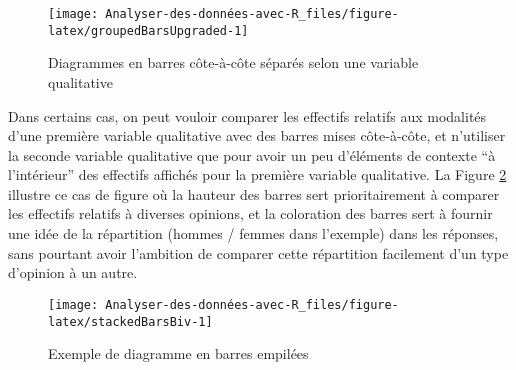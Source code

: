 \documentclass[
  french,
]{book}
\newenvironment{Shaded}{\begin{snugshade}}{\end{snugshade}}
\newcommand{\DataTypeTok}[1]{\textcolor[rgb]{0.13,0.29,0.53}{#1}}
\newcommand{\DecValTok}[1]{\textcolor[rgb]{0.00,0.00,0.81}{#1}}
\newcommand{\FloatTok}[1]{\textcolor[rgb]{0.00,0.00,0.81}{#1}}
\newcommand{\KeywordTok}[1]{\textcolor[rgb]{0.13,0.29,0.53}{\textbf{#1}}}
\newcommand{\NormalTok}[1]{#1}
\newcommand{\OperatorTok}[1]{\textcolor[rgb]{0.81,0.36,0.00}{\textbf{#1}}}
\newcommand{\StringTok}[1]{\textcolor[rgb]{0.31,0.60,0.02}{#1}}
\begin{document}
\begin{figure}

{\centering \texttt{[image: Analyser-des-données-avec-R\_files/figure-latex/groupedBarsUpgraded-1]} 

}

\caption{Diagrammes en barres côte-à-côte séparés selon une variable qualitative}\label{fig:groupedBarsUpgraded}
\end{figure}

Dans certains cas, on peut vouloir comparer les effectifs relatifs aux modalités d'une première variable qualitative avec des barres mises côte-à-côte, et n'utiliser la seconde variable qualitative que pour avoir un peu d'éléments de contexte ``à l'intérieur'' des effectifs affichés pour la première variable qualitative. La Figure \ref{fig:stackedBarsBiv} illustre ce cas de figure où la hauteur des barres sert prioritairement à comparer les effectifs relatifs à diverses opinions, et la coloration des barres sert à fournir une idée de la répartition (hommes / femmes dans l'exemple) dans les réponses, sans pourtant avoir l'ambition de comparer cette répartition facilement d'un type d'opinion à un autre.

\begin{Shaded}
\end{Shaded}

\begin{figure}

{\centering \texttt{[image: Analyser-des-données-avec-R\_files/figure-latex/stackedBarsBiv-1]} 

}

\caption{Exemple de diagramme en barres empilées}\label{fig:stackedBarsBiv}
\end{figure}
\end{document}
